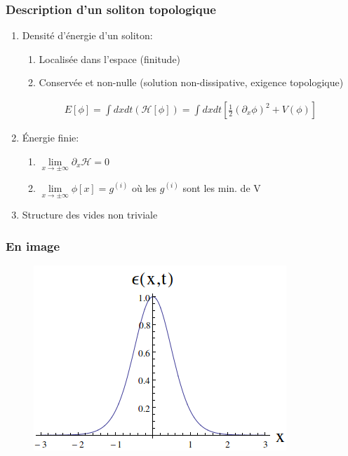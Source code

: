 \documentclass[handout]{beamer}
\begin{document}
\begin{frame}\frametitle{Description d'un soliton topologique}

	\begin{enumerate}
	\item Densité d'énergie d'un soliton: 
	\begin{enumerate}
	\item Localisée dans l'espace (finitude)
	\item Conservée et non-nulle (solution non-dissipative, exigence topologique)
	\end{enumerate}

				\begin{align*}
	E[\phi] = \int{dxdt (\mathcal{H}[\phi])} = \int{dxdt [\frac{1}{2} (\partial_x \phi)^2 + V(\phi)]}
	\end{align*}
	\item Énergie finie:
	\begin{enumerate}
	\item  $\lim\limits_{x \to \pm\infty}\partial_x \mathcal{H} =0$
	\item  $\lim\limits_{x \to \pm\infty} \phi[x] = g^{(i)}$ où les $g^{(i)}$ sont les min. de V	
	\end{enumerate}	
	\item Structure des vides non triviale
	\end{enumerate}

		\end{frame}
	\begin{frame}\frametitle{En image}

	\begin{figure}[0.3\textwidth]
   \includegraphics[scale=0.5]{densite.png}
    \end{figure}
	

\end{frame}
\end{document}
